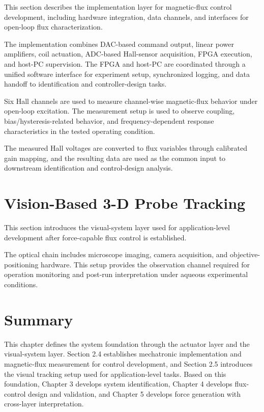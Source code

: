 This section describes the implementation layer for magnetic-flux control development, including hardware integration, data channels, and interfaces for open-loop flux characterization.

The implementation combines DAC-based command output, linear power amplifiers, coil actuation, ADC-based Hall-sensor acquisition, FPGA execution, and host-PC supervision. The FPGA and host-PC are coordinated through a unified software interface for experiment setup, synchronized logging, and data handoff to identification and controller-design tasks.

Six Hall channels are used to measure channel-wise magnetic-flux behavior under open-loop excitation. The measurement setup is used to observe coupling, bias/hysteresis-related behavior, and frequency-dependent response characteristics in the tested operating condition.

The measured Hall voltages are converted to flux variables through calibrated gain mapping, and the resulting data are used as the common input to downstream identification and control-design analysis.

\section{Vision-Based 3-D Probe Tracking}

This section introduces the visual-system layer used for application-level development after force-capable flux control is established.

The optical chain includes microscope imaging, camera acquisition, and objective-positioning hardware. This setup provides the observation channel required for operation monitoring and post-run interpretation under aqueous experimental conditions.

\section{Summary}

This chapter defines the system foundation through the actuator layer and the visual-system layer. Section 2.4 establishes mechatronic implementation and magnetic-flux measurement for control development, and Section 2.5 introduces the visual tracking setup used for application-level tasks. Based on this foundation, Chapter 3 develops system identification, Chapter 4 develops flux-control design and validation, and Chapter 5 develops force generation with cross-layer interpretation.
